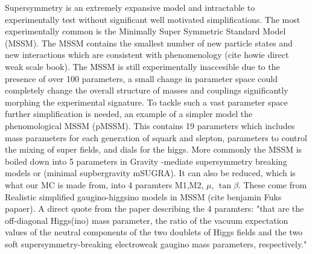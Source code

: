 Supersymmetry is an extremely expansive model and intractable to experimentally test without significant well motivated simplifications. The most experimentally common is the Minimally Super Symmetric Standard Model (MSSM). The MSSM contains the smallest number of new particle states and new interactions which are consistent with phenomenology (cite howie direct weak scale book). The MSSM is still experimentally inaccesible due to the presence of over 100 parameters, a small change in parameter space could completely change the overall structure of masses and couplings significantly morphing the experimental signature. To tackle such a vast parameter space further simplification is needed, an example of a simpler model the phenomological MSSM (pMSSM). This contains 19 parameters which includes mass parameters for each generation of squark and slepton, parameters to control the mixing of super fields, and dials for the higgs.  More commonly the MSSM is boiled down into 5 parameters in Gravity -mediate supersymmetry breaking models or (minimal supbergravity mSUGRA). It can also be reduced, which is what our MC is made from, into 4 paramters M1,M2, $\mu$, $\tan\beta$. These come from Realistic simplified gaugino-higgsino models in MSSM (cite benjamin Fuks papaer). A direct quote from the paper describing the 4 paramters: "that are the off-diagonal Higgs(ino) mass parameter, the ratio of the vacuum expectation values of the neutral components of the two doublets of Higgs fields and the two soft
supersymmetry-breaking electroweak gaugino mass parameters, respectively."




